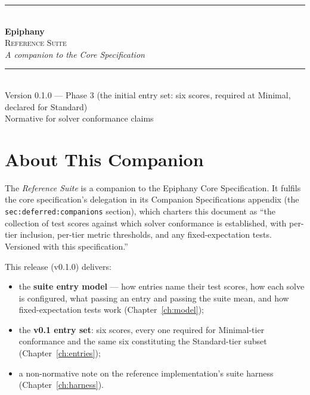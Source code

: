 \documentclass[11pt,letterpaper]{report}
\newcommand{\sectionsc}[1]{{\addfontfeatures{Letters=SmallCaps}#1}}
\begin{document}
\begin{titlepage}
  \thispagestyle{empty}
  \centering
  \vspace*{2.2in}
  {\color{epiphanygold}\rule{3in}{0.8pt}}\\[18pt]
  {\titlefont\fontsize{34pt}{38pt}\selectfont\color{epiphanyteal}\bfseries Epiphany}\\[10pt]
  {\Large\scshape\color{epiphanyslate}Reference Suite}\\[6pt]
  {\large\itshape\color{epiphanyslate}A companion to the Core Specification}\\[14pt]
  {\color{epiphanygold}\rule{3in}{0.8pt}}\\[24pt]
  {\normalsize\color{epiphanyink}Version 0.1.0 --- Phase 3 (the initial entry set: six scores, required at Minimal, declared for Standard)}\\[4pt]
  {\small\color{epiphanyslate}Normative for solver conformance claims}
  \vfill
\end{titlepage}

\tableofcontents

\chapter{About This Companion}
\label{ch:about}

The \emph{Reference Suite} is a companion to the Epiphany Core
Specification. It fulfils the core specification's delegation in its
\sectionsc{Companion Specifications} appendix (the
\texttt{sec:deferred:companions} section), which charters this document as
``the collection of test scores against which solver conformance is
established, with per-tier inclusion, per-tier metric thresholds, and any
fixed-expectation tests. Versioned with this specification.''

This release (v0.1.0) delivers:

\begin{itemize}
  \item the \textbf{suite entry model} --- how entries name their test
    scores, how each solve is configured, what passing an entry and
    passing the suite mean, and how fixed-expectation tests work
    (Chapter~\ref{ch:model});
  \item the \textbf{v0.1 entry set}: six scores, every one required for
    Minimal-tier conformance and the same six constituting the
    Standard-tier subset (Chapter~\ref{ch:entries});
  \item a non-normative note on the reference implementation's suite
    harness (Chapter~\ref{ch:harness}).
\end{itemize}
\end{document}
